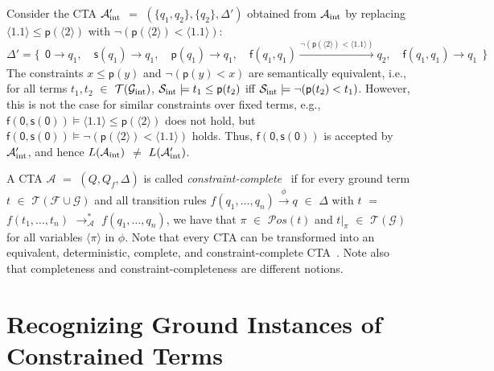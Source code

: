 \documentclass[copyright,creativecommons]{eptcs}
\newcommand{\cA}{\mathcal{A}}
\newcommand{\cF}{\mathcal{F}}
\newcommand{\cG}{\mathcal{G}}
\newcommand{\cS}{\mathcal{S}}
\newcommand{\Pos}{{\mathcal{P}os}}
\newcommand{\posvar}[1]{{\langle}#1{\rangle}}
\newcommand{\Terms}{{\mathcal{T}}}
\renewcommand{\equiv}{=}
\begin{document}
\begin{example}
 Consider the CTA $\cA_{\rm int}'$ $=$ $(\{ q_1, q_2 \},\{ q_2
 \},\Delta')$ obtained from 
 $\cA_{\rm int}$ by replacing $\posvar{1.1} \leq \mathsf{p}(\posvar{2})$
 with $\neg (\mathsf{p}(\posvar{2}) < \posvar{1.1})$:
 \[
 \Delta' = 
 \{~~
 \mathsf{0} \to q_1,
 \quad
 \mathsf{s}(q_1) \to q_1, 
 \quad
 \mathsf{p}(q_1) \to q_1, 
 \quad
 \mathsf{f}(q_1,q_1) \xrightarrow[]{\neg (\mathsf{p}(\posvar{2}) < \posvar{1.1})} q_2,
 \quad
 \mathsf{f}(q_1,q_1) \to q_1
 ~~\}
\]
 The constraints $x \leq \mathsf{p}(y)$ and $\neg (\mathsf{p}(y) < x)$ are 
 semantically equivalent, i.e., for all terms $t_1,t_2$ $\in$
 $\Terms(\cG_{\rm int})$, $\cS_{\rm int} \models t_1 \leq \mathsf{p}(t_2)$
 iff $\cS_{\rm int} \models \neg (\mathsf{p}(t_2) < t_1)$. 
 However, this is not the case for similar constraints over fixed terms,
 e.g., $\mathsf{f}(\mathsf{0},\mathsf{s}(\mathsf{0})) \models
 \posvar{1.1} \leq \mathsf{p}(\posvar{2})$ does not hold, but
 $\mathsf{f}(\mathsf{0},\mathsf{s}(\mathsf{0})) \models 
 \neg (\mathsf{p}(\posvar{2}) < \posvar{1.1})$ holds.
 Thus, $\mathsf{f}(\mathsf{0},\mathsf{s}(\mathsf{0}))$ is accepted by
 $\cA_{\rm int}'$, and hence $L(\cA_{\rm int})$ $\ne$ $L(\cA_{\rm
 int}')$. 
\end{example}

A CTA $\cA$ $=$ $(Q,Q_f,\Delta)$ is called
\emph{constraint-complete}~\cite{CTA} if for every ground term $t$ $\in$
$\Terms(\cF\cup\cG)$ and all transition rules 
$f(q_1,\ldots,q_n) \xrightarrow[]{\phi} q$ $\in$ $\Delta$ with $t$ $\equiv$
$f(t_1,\ldots,t_n)$ $\to^*_\cA$ $f(q_1,\ldots,q_n)$, 
we have that $\pi$ $\in$ $\Pos(t)$ and $t|_\pi$ $\in$ $\Terms(\cG)$
for all variables $\posvar{\pi}$ in $\phi$.
Note that every CTA can be transformed into an equivalent,
deterministic, complete, and constraint-complete CTA~\cite{CTA}. 
Note also that completeness and constraint-completeness are different notions. 

\section{Recognizing Ground Instances of Constrained Terms}
\label{sec:construction}
\end{document}
